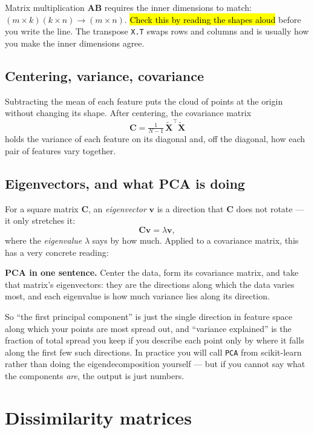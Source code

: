 \documentclass[11pt]{article}
\newcommand{\ask}[1]{\textcolor{accent}{\textbf{#1}}}
\begin{document}
Matrix multiplication $\bm{A}\bm{B}$ requires the inner dimensions to match:
$(m \times k)(k \times n) \rightarrow (m \times n)$. \hl{Check this by
reading the shapes aloud} before you write the line. The transpose
\texttt{X.T} swaps rows and columns and is usually how you make the inner
dimensions agree.

\subsection{Centering, variance, covariance}

Subtracting the mean of each feature puts the cloud of points at the origin
without changing its shape. After centering, the covariance matrix
\[
\bm{C} = \tfrac{1}{N-1}\,\tilde{\bm{X}}^{\!\top}\tilde{\bm{X}}
\]
holds the variance of each feature on its diagonal and, off the diagonal, how
each pair of features vary together.

\subsection{Eigenvectors, and what PCA is doing}

For a square matrix $\bm{C}$, an \emph{eigenvector} $\bm{v}$ is a direction that
$\bm{C}$ does not rotate --- it only stretches it:
\[
\bm{C}\bm{v} = \lambda \bm{v},
\]
where the \emph{eigenvalue} $\lambda$ says by how much. Applied to a covariance
matrix, this has a very concrete reading:

\begin{keybox}
\ask{PCA in one sentence.} Center the data, form its covariance matrix, and
take that matrix's eigenvectors: they are the directions along which the data
varies most, and each eigenvalue is how much variance lies along its direction.
\end{keybox}

So ``the first principal component'' is just the single direction in feature
space along which your points are most spread out, and ``variance explained''
is the fraction of total spread you keep if you describe each point only by
where it falls along the first few such directions. In practice you will call
\texttt{PCA} from scikit-learn rather than doing the eigendecomposition
yourself --- but if you cannot say what the components \emph{are}, the output is
just numbers.

\section{Dissimilarity matrices}
\end{document}

